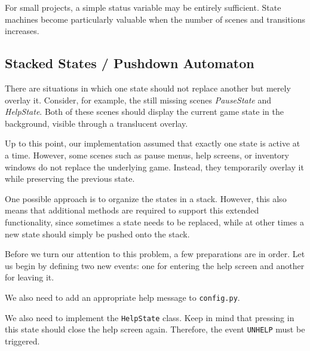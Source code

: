 \begin{warningbox}
	For small projects, a simple status variable may be entirely sufficient. State machines become particularly valuable when the number of scenes and transitions increases.
\end{warningbox}

\subsection{Stacked States / Pushdown Automaton}

There are situations in which one state should not replace another but merely overlay it. Consider, for example, the still missing scenes \emph{PauseState} and \emph{HelpState}. Both of these scenes should display the current game state in the background, visible through a translucent overlay.

Up to this point, our implementation assumed that exactly one state is active at a time. However, some scenes such as pause menus, help screens, or inventory windows do not replace the underlying game. Instead, they temporarily overlay it while preserving the previous state.

One possible approach is to organize the states in a \gls{stack}. However, this also means that additional methods are required to support this extended functionality, since sometimes a state needs to be replaced, while at other times a new state should simply be pushed onto the stack.

Before we turn our attention to this problem, a few preparations are in order. Let us begin by defining two new events: one for entering the help screen and another for leaving it.

\newpage
{}

We also need to add an appropriate help message to \texttt{config.py}.


We also need to implement the \texttt{HelpState} class. Keep in mind that pressing  in this state should close the help screen again. Therefore, the event \texttt{UNHELP} must be triggered.


